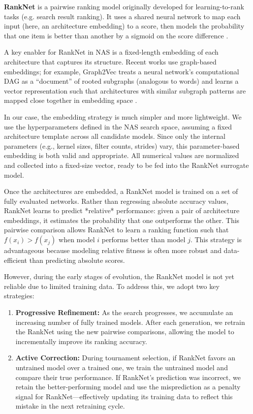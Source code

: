 
\textbf{RankNet} is a pairwise ranking model originally developed for learning-to-rank tasks (e.g. search result ranking). It uses a shared neural network to map each input (here, an architecture embedding) to a score, then models the probability that one item is better than another by a sigmoid on the score difference \cite{RankNet}.

A key enabler for RankNet in NAS is a fixed-length embedding of each architecture that captures its structure. Recent works use graph-based embeddings; for example, Graph2Vec treats a neural network’s computational DAG as a “document” of rooted subgraphs (analogous to words) and learns a vector representation such that architectures with similar subgraph patterns are mapped close together in embedding space \cite{RankNet}.

In our case, the embedding strategy is much simpler and more lightweight. We use the hyperparameters defined in the NAS search space, assuming a fixed architecture template across all candidate models. Since only the internal parameters (e.g., kernel sizes, filter counts, strides) vary, this parameter-based embedding is both valid and appropriate. All numerical values are normalized and collected into a fixed-size vector, ready to be fed into the RankNet surrogate model.

Once the architectures are embedded, a RankNet model is trained on a set of fully evaluated networks. Rather than regressing absolute accuracy values, RankNet learns to predict *relative* performance: given a pair of architecture embeddings, it estimates the probability that one outperforms the other. This pairwise comparison allows RankNet to learn a ranking function such that $f(x_i) > f(x_j)$ when model $i$ performs better than model $j$. This strategy is advantageous because modeling relative fitness is often more robust and data-efficient than predicting absolute scores.

However, during the early stages of evolution, the RankNet model is not yet reliable due to limited training data. To address this, we adopt two key strategies:

\begin{enumerate}
    \item \textbf{Progressive Refinement:} As the search progresses, we accumulate an increasing number of fully trained models. After each generation, we retrain the RankNet using the new pairwise comparisons, allowing the model to incrementally improve its ranking accuracy.
    
    \item \textbf{Active Correction:} During tournament selection, if RankNet favors an untrained model over a trained one, we train the untrained model and compare their true performance. If RankNet’s prediction was incorrect, we retain the better-performing model and use the misprediction as a penalty signal for RankNet—effectively updating its training data to reflect this mistake in the next retraining cycle.
\end{enumerate}

